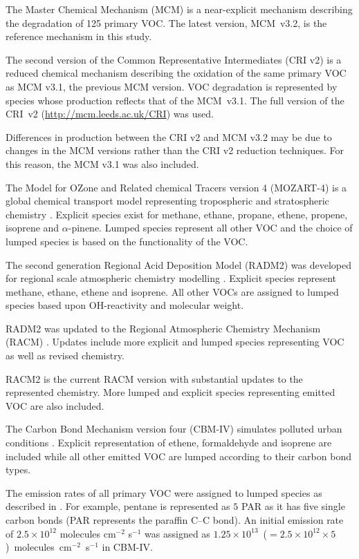 The Master Chemical Mechanism (MCM) \citep{Jenkin:1997, Jenkin:2003, Saunders:2003, Bloss:2005, MCM_Site} is a near-explicit mechanism describing the degradation of 125 primary VOC. 
The latest version, \mbox{MCM v3.2}, is the reference mechanism in this study.

The second version of the Common Representative Intermediates (CRI v2) \citep{Jenkin:2008} is a reduced chemical mechanism describing the oxidation of the same primary VOC as MCM v3.1, the previous MCM version. 
VOC degradation is represented by species whose  production reflects that of the \mbox{MCM v3.1}. 
The full version of the \mbox{CRI v2} (\url{http://mcm.leeds.ac.uk/CRI}) was used.

Differences in  production between the CRI v2 and MCM v3.2 may be due to changes in the MCM versions rather than the CRI v2 reduction techniques.
For this reason, the MCM v3.1 was also included.

The Model for OZone and Related chemical Tracers version 4 (MOZART-4) is a global chemical transport model representing tropospheric and stratospheric chemistry \citep{Emmons:2010}. 
Explicit species exist for methane, ethane, propane, ethene, propene, isoprene and $\alpha$-pinene.
Lumped species represent all other VOC and the choice of lumped species is based on the functionality of the VOC.

The second generation Regional Acid Deposition Model (RADM2) was developed for regional scale atmospheric chemistry modelling \citep{Stockwell:1990}. 
Explicit species represent methane, ethane, ethene and isoprene.
All other VOCs are assigned to lumped species based upon OH-reactivity and molecular weight.

RADM2 was updated to the Regional Atmospheric Chemistry Mechanism (RACM) \citep{Stockwell:1997}. 
Updates include more explicit and lumped species representing VOC as well as revised chemistry.

RACM2 is the current RACM version \citep{Goliff:2013} with substantial updates to the represented chemistry. 
More lumped and explicit species representing emitted VOC are also included.

The Carbon Bond Mechanism version four (CBM-IV) simulates polluted urban conditions \citep{Gery:1989}. 
Explicit representation of ethene, formaldehyde and isoprene are included while all other emitted VOC are lumped according to their carbon bond types. 

The emission rates of all primary VOC were assigned to lumped species as described in \citet{Hogo:1989}. 
For example, pentane is represented as $5$ PAR as it has five single carbon bonds (PAR represents the paraffin C--C bond).
An initial emission rate of $2.5 \times 10^{12}$ molecules cm$^{-2}$ s$^{-1}$ was assigned as \mbox{$1.25 \times 10^{13}$ ($= 2.5 \times 10^{12} \times 5$) molecules cm$^{-2}$ s$^{-1}$} in CBM-IV.

